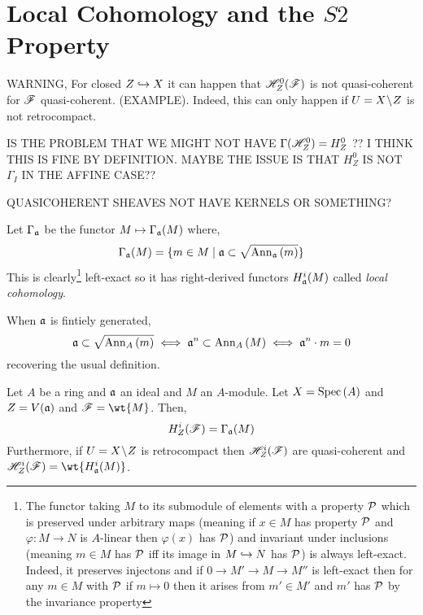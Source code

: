 \documentclass[12pt]{article}
\begin{document}
\section{Local Cohomology and the $S2$ Property}

WARNING, For closed $Z \hookrightarrow X$ it can happen that $\mathscr{H}_Z^0(\mathscr{F})$ is not quasi-coherent for $\mathscr{F}$ quasi-coherent. (EXAMPLE). Indeed, this can only happen if $U = X \! \setminus \! Z$ is not retrocompact. 

IS THE PROBLEM THAT WE MIGHT NOT HAVE $\Gamma(\mathscr{H}_Z^0) = H_Z^0$ ?? I THINK THIS IS FINE BY DEFINITION. MAYBE THE ISSUE IS THAT $H_Z^0$ IS NOT $\Gamma_I$ IN THE AFFINE CASE??

QUASICOHERENT SHEAVES NOT HAVE KERNELS OR SOMETHING?


\begin{rmk}

\end{rmk}


\begin{defn}
Let $\Gamma_{\mathfrak{a}}$ be the functor $M \mapsto \Gamma_{\mathfrak{a}}(M)$ where,
\[ \Gamma_{\mathfrak{a}}(M) = \{ m \in M \mid \mathfrak{a} \subset \sqrt{\mathrm{Ann}_{\mathfrak{a}}\left(m\right)} \} \]
This is clearly\footnote{The functor taking $M$ to its submodule of elements with a property $\mathcal{P}$ which is preserved under arbitrary maps (meaning if $x \in M$ has property $\mathcal{P}$ and $\varphi : M \to N$ is $A$-linear then $\varphi(x)$ has $\mathcal{P}$) and invariant under inclusions (meaning $m \in M$ has $\mathcal{P}$ iff its image in $M \hookrightarrow N$ has $\mathcal{P}$) is always left-exact. Indeed, it preserves injectons and if $0 \to M' \to M \to M''$ is left-exact then for any $m \in M$ with $\mathcal{P}$ if $m \mapsto 0$ then it arises from $m' \in M'$ and $m'$ has $\mathcal{P}$ by the invariance property} left-exact so it has right-derived functors $H_{\mathfrak{a}}^i(M)$ called \textit{local cohomology}. 
\end{defn}

\begin{rmk}
When $\mathfrak{a}$ is fintiely generated, 
\[ \mathfrak{a} \subset \sqrt{\mathrm{Ann}_{A}\left(m\right)} \iff \mathfrak{a}^n \subset \mathrm{Ann}_{A}\left(M\right) \iff \mathfrak{a}^n \cdot m = 0 \]
recovering the usual definition. 
\end{rmk}

\begin{lemma}
Let $A$ be a ring and $\mathfrak{a}$ an ideal and $M$ an $A$-module. Let $X = \mathrm{Spec}\left( A \right)$ and $Z = V(\mathfrak{a})$ and $\F = \wt{M}$. Then,
\[ H^i_{Z}(\mathscr{F}) = \Gamma_{\mathfrak{a}}(M) \]
Furthermore, if $U = X \! \setminus \! Z$ is retrocompact then $\mathscr{H}^i_{Z}(\mathscr{F})$ are quasi-coherent and $\H^i_{Z}(\F) = \wt{H^i_{\a}(M)}$.
\end{lemma}
\end{document}
